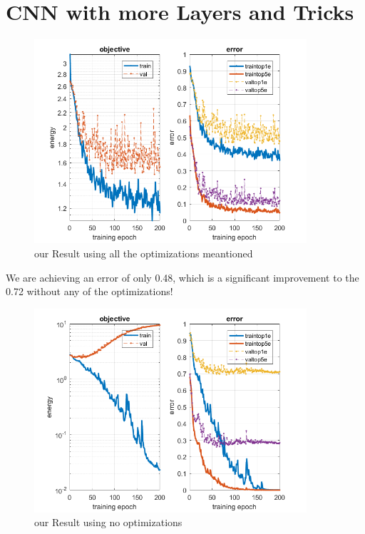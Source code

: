 \documentclass[12pt]{article}
\begin{document}
\newpage
\section{CNN with more Layers and Tricks}

        \begin{figure}[H]
            \centering
                \includegraphics[width=0.9\textwidth]{Plots/q4_plot_epo_200.png}
                \caption{our Result using all the optimizations meantioned}
        \end{figure}
        We are achieving an error of only 0.48, which is a significant improvement to the 0.72 without any of the optimizations!
        \begin{figure}[H]
            \centering
                \includegraphics[width=0.9\textwidth]{Plots/init_plot_epo_200.png}
                \caption{our Result using no optimizations}
        \end{figure}
\end{document}
